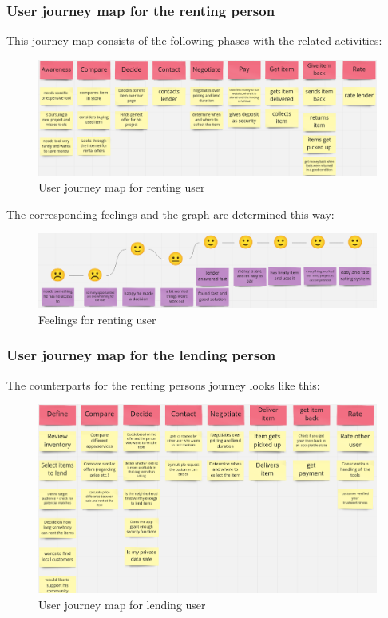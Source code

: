 		\subsubsection{User journey map for the renting person}
			This journey map consists of the following phases with the related activities:
			
			\begin{figure}[H]
				\centering
				\includegraphics[width=\linewidth]{abb/2_context_of_use/user_journey_map_renting.png}
				\caption{User journey map for renting user}
				\label{fig:ujm_renting}
			\end{figure}
			
			\noindent
			The corresponding feelings and the graph are determined this way:
			
			\begin{figure}[H]
				\centering
				\includegraphics[width=\linewidth]{abb/2_context_of_use/feelings_renting.png}
				\caption{Feelings for renting user}
				\label{fig:ujm_renting_feelings}
			\end{figure}
		
		\subsubsection{User journey map for the lending person}
			The counterparts for the renting persons journey looks like this:
			
			\begin{figure}[H]
				\centering
				\includegraphics[width=\linewidth]{abb/2_context_of_use/user_journey_map_lending.png}
				\caption{User journey map for lending user}
				\label{fig:ujm_lending}
			\end{figure}
		
